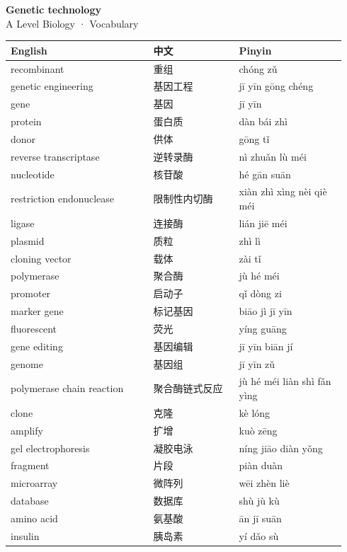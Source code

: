 \documentclass[11pt]{article}
\begin{document}
\begin{center}
  {\LARGE\bfseries Genetic technology}\\[0.35em]
  {\large A Level Biology · Vocabulary}
\end{center}
\vspace{0.6em}

\begin{longtable}{@{}p{0.40\linewidth}p{0.24\linewidth}p{0.30\linewidth}@{}}
\toprule
\textbf{English} & \textbf{中文} & \textbf{Pinyin} \\
\midrule
\endhead
\bottomrule
\endlastfoot
recombinant & 重组 & chóng zǔ \\
genetic engineering & 基因工程 & jī yīn gōng chéng \\
gene & 基因 & jī yīn \\
protein & 蛋白质 & dàn bái zhì \\
donor & 供体 & gōng tǐ \\
reverse transcriptase & 逆转录酶 & nì zhuǎn lù méi \\
nucleotide & 核苷酸 & hé gān suān \\
restriction endonuclease & 限制性内切酶 & xiàn zhì xìng nèi qiè méi \\
ligase & 连接酶 & lián jiē méi \\
plasmid & 质粒 & zhì lì \\
cloning vector & 载体 & zài tǐ \\
polymerase & 聚合酶 & jù hé méi \\
promoter & 启动子 & qǐ dòng zi \\
marker gene & 标记基因 & biāo jì jī yīn \\
fluorescent & 荧光 & yíng guāng \\
gene editing & 基因编辑 & jī yīn biān jí \\
genome & 基因组 & jī yīn zǔ \\
polymerase chain reaction & 聚合酶链式反应 & jù hé méi liàn shì fǎn yìng \\
clone & 克隆 & kè lóng \\
amplify & 扩增 & kuò zēng \\
gel electrophoresis & 凝胶电泳 & níng jiāo diàn yǒng \\
fragment & 片段 & piàn duàn \\
microarray & 微阵列 & wēi zhèn liè \\
database & 数据库 & shù jù kù \\
amino acid & 氨基酸 & ān jī suān \\
insulin & 胰岛素 & yí dǎo sù \\

\end{longtable}
\end{document}
